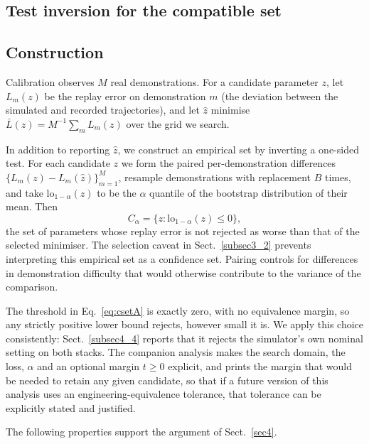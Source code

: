\documentclass[pdflatex,iicol,sn-apa]{sn-jnl}
\theoremstyle{remark}
\begin{document}
\begin{appendices}

\section{Test inversion for the compatible set}\label{secA}

\subsection{Construction}\label{secA1}

Calibration observes $M$ real demonstrations. For a candidate parameter $z$, let $L_m(z)$ be the
replay error on demonstration $m$ (the deviation between the simulated and recorded trajectories),
and let $\hat z$ minimise $\bar L(z) = M^{-1}\sum_m L_m(z)$ over the grid we search.

In addition to reporting $\hat z$, we construct an empirical set by inverting a one-sided test.
For each candidate $z$ we form the paired
per-demonstration differences $\{L_m(z) - L_m(\hat z)\}_{m=1}^{M}$, resample demonstrations with
replacement $B$ times, and take $\mathrm{lo}_{1-\alpha}(z)$ to be the $\alpha$ quantile of the
bootstrap distribution of their mean. Then
\begin{equation}\label{eq:csetA}
C_\alpha = \big\{ z : \mathrm{lo}_{1-\alpha}(z) \le 0 \big\},
\end{equation}
the set of parameters whose replay error is not rejected as worse than that of the selected
minimiser. The selection caveat in Sect.~\ref{subsec3_2} prevents interpreting this empirical set
as a confidence set. Pairing controls for differences in demonstration difficulty that would
otherwise contribute to the variance of the comparison.

The threshold in Eq.~\eqref{eq:csetA} is exactly zero, with no equivalence margin, so any
strictly positive lower bound rejects, however small it is. We apply this choice consistently:
Sect.~\ref{subsec4_4} reports that it
rejects the simulator's own nominal setting on both stacks. The companion analysis
makes the search domain, the loss, $\alpha$ and an optional margin $t \ge 0$ explicit, and
prints the margin that would be needed to retain any given candidate, so that if a future version of
this analysis uses an engineering-equivalence tolerance, that tolerance can be explicitly stated
and justified.

The following properties support the argument of Sect.~\ref{sec4}.


\end{appendices}
\end{document}
